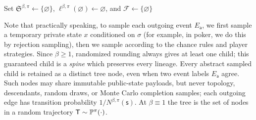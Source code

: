 \documentclass[12pt, a4paper]{article}
\begin{document}
\begin{algorithm}[H]
\caption{$(\mathfrak S^{\beta,\pi},\ell^{\beta,\pi},N^{\beta,\pi})\gets$~\texttt{SampleTree}$(\pi,\beta)$}
\label{alg:sample-tree}
\DontPrintSemicolon
{}
\KwParam{$\pi$, rollout profile; $\beta:\mathcal S\setminus\mathcal T\to[1,\infty)$, intensity}
Set $\mathfrak{S}^{\beta,\pi}\gets\{\varnothing\}$, $\ell^{\beta,\pi}(\varnothing)\gets\varnothing$, and $\mathcal F\gets\{\varnothing\}$\;
\end{algorithm}

\begin{remark}
  Note that practically speaking, to sample each outgoing event $E_{\mathsf{a}}$, we first sample a temporary private state $x$ conditioned on $\sigma$ (for example, in poker, we do this by rejection sampling), then we sample according to the chance rules and player strategies.
  Since $\beta\geq1$, randomized rounding always gives at least one child; this guaranteed child is a \emph{spine} which preserves every lineage.
  Every abstract sampled child is retained as a distinct tree node, even when two event labels $E_{\mathsf a}$ agree.
  Such nodes may share immutable public-state payloads, but never topology, descendants, random draws, or Monte Carlo completion samples; each outgoing edge has transition probability $1/N^{\beta,\pi}(\mathsf s)$.
  At $\beta \equiv 1$ the tree is the set of nodes in a random trajectory $\mathsf{T} \sim \mathbb{P}^\pi(\cdot)$.
\end{remark}
\end{document}
